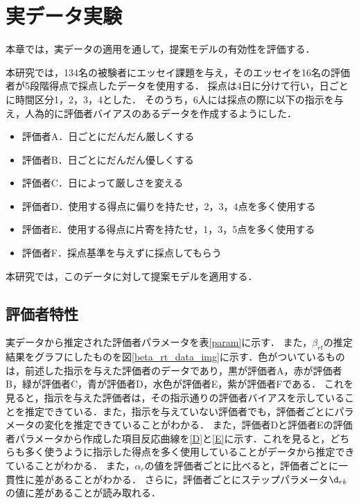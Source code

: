 \documentclass[a4paper,11pt,oneside,openany]{jsbook}
\begin{document}
\newpage
\chapter{実データ実験}
本章では，実データの適用を通して，提案モデルの有効性を評価する．

本研究では，134名の被験者にエッセイ課題を与え，そのエッセイを16名の評価者が5段階得点で採点したデータを使用する．
採点は4日に分けて行い，日ごとに時間区分1，2，3，4とした．
そのうち，6人には採点の際に以下の指示を与え，人為的に評価者バイアスのあるデータを作成するようにした．

\begin{itemize}
  \item 評価者A．日ごとにだんだん厳しくする
  \item 評価者B．日ごとにだんだん優しくする
  \item 評価者C．日によって厳しさを変える
  \item 評価者D．使用する得点に偏りを持たせ，2，3，4点を多く使用する
  \item 評価者E．使用する得点に片寄を持たせ，1，3，5点を多く使用する
  \item 評価者F．採点基準を与えずに採点してもらう
\end{itemize}

本研究では，このデータに対して提案モデルを適用する．
\section{評価者特性}
実データから推定された評価者パラメータを表\ref{param}に示す．
また，$\beta_{rt}$の推定結果をグラフにしたものを図\ref{beta_rt_data_img}に示す．色がついているものは，前述した指示を与えた評価者のデータであり，黒が評価者A，赤が評価者B，緑が評価者C，青が評価者D，水色が評価者E，紫が評価者Fである．
これを見ると，指示を与えた評価者は，その指示通りの評価者バイアスを示していることを推定できている．また，指示を与えていない評価者でも，評価者ごとにパラメータの変化を推定できていることがわかる．
また，評価者Dと評価者Eの評価者パラメータから作成した項目反応曲線を\ref{D}と\ref{E}に示す．これを見ると，どちらも多く使うように指示した得点を多く使用していることがデータから推定できていることがわかる．
また，$\alpha_r$の値を評価者ごとに比べると，評価者ごとに一貫性に差があることがわかる．
さらに，評価者ごとにステップパラメータ$\d_{rk}$の値に差があることが読み取れる．
\end{document}
